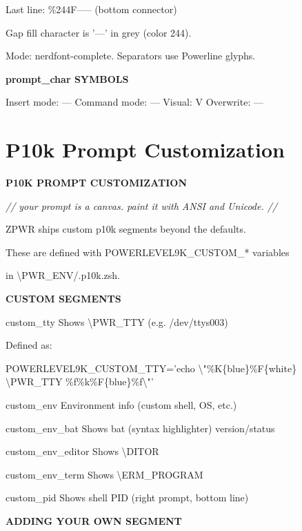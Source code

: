 \documentclass[11pt,a4paper,twoside]{book}
\begin{document}
Last line:   \%244F-----  (bottom connector)

Gap fill character is '---' in grey (color 244).

Mode: nerdfont-complete. Separators use Powerline glyphs.


\vspace{12pt}
{\bfseries\color{neonyellow} prompt\_char SYMBOLS}\vspace{4pt}

Insert mode: ---  Command mode: ---  Visual: V  Overwrite: ---


\vspace{16pt}

\section{P10k Prompt Customization}


\vspace{10pt}
{\large\bfseries\color{neoncyan} P10K PROMPT CUSTOMIZATION}\vspace{6pt}

{\small\itshape\color{dimtext} // your prompt is a canvas. paint it with ANSI and Unicode. //}

ZPWR ships custom p10k segments beyond the defaults.

These are defined with POWERLEVEL9K\_CUSTOM\_* variables

in \textbackslash{}PWR\_ENV/.p10k.zsh.


\vspace{12pt}
{\bfseries\color{neonyellow} CUSTOM SEGMENTS}\vspace{4pt}

custom\_tty       Shows \textbackslash{}PWR\_TTY (e.g. /dev/ttys003)

Defined as:

POWERLEVEL9K\_CUSTOM\_TTY='echo \textbackslash{}"\%K\{blue\}\%F\{white\} \textbackslash{}PWR\_TTY \%f\%k\%F\{blue\}\%f\textbackslash{}"'

custom\_env       Environment info (custom shell, OS, etc.)

custom\_env\_bat   Shows bat (syntax highlighter) version/status

custom\_env\_editor Shows \textbackslash{}DITOR

custom\_env\_term  Shows \textbackslash{}ERM\_PROGRAM

custom\_pid       Shows shell PID (right prompt, bottom line)


\vspace{12pt}
{\bfseries\color{neonyellow} ADDING YOUR OWN SEGMENT}\vspace{4pt}
\end{document}
